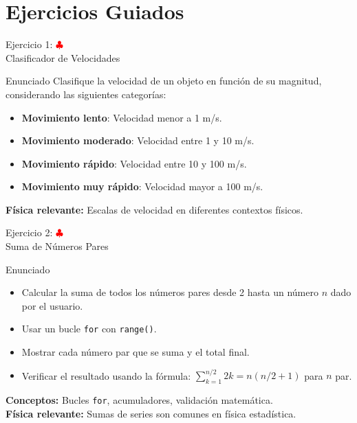 \documentclass[10pt]{beamer}
\begin{document}
\section{Ejercicios Guiados}

\begin{frame}{Ejercicio 1: \hfill \textcolor{red}{$\clubsuit$} \\ Clasificador de Velocidades}
  \begin{block}{Enunciado}
    Clasifique la velocidad de un objeto en función de su magnitud, considerando las siguientes categorías:
    \begin{itemize}
      \item \textbf{Movimiento lento}: Velocidad menor a 1 m/s.
      \item \textbf{Movimiento moderado}: Velocidad entre 1 y 10 m/s.
      \item \textbf{Movimiento rápido}: Velocidad entre 10 y 100 m/s.
      \item \textbf{Movimiento muy rápido}: Velocidad mayor a 100 m/s.
    \end{itemize}
    \textbf{Física relevante:} Escalas de velocidad en diferentes contextos físicos.
  \end{block}
\end{frame}



\begin{frame}{Ejercicio 2: \hfill \textcolor{red}{$\clubsuit$} \\ Suma de Números Pares}
  \begin{block}{Enunciado}
    \begin{itemize}
      \item Calcular la suma de todos los números pares desde 2 hasta un número \(n\) dado por el usuario.
      \item Usar un bucle \texttt{for} con \texttt{range()}.
      \item Mostrar cada número par que se suma y el total final.
      \item Verificar el resultado usando la fórmula: $\sum_{k=1}^{n/2} 2k = n(n/2 + 1)$ para \(n\) par.
    \end{itemize}
  \end{block}
  
  \textbf{Conceptos:} Bucles \texttt{for}, acumuladores, validación matemática.
  \\
  \textbf{Física relevante:} Sumas de series son comunes en física estadística.
\end{frame}
\end{document}
